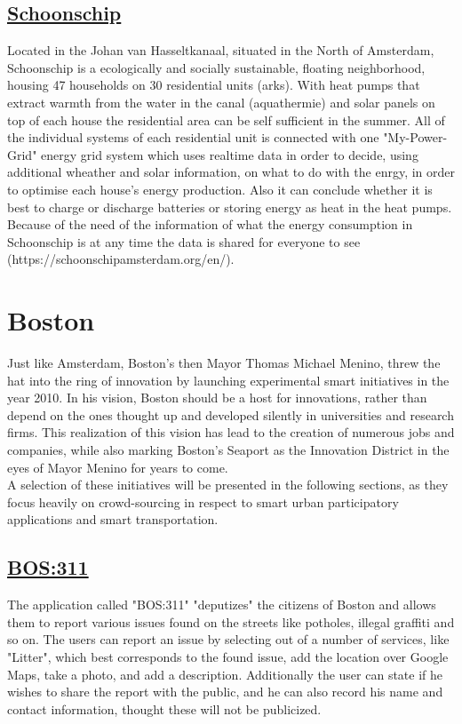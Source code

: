 \documentclass[a4paper,12pt]{report}
\begin{document}
		\subsection[Schoonschip]{\href{https://schoonschipamsterdam.org/en/}{Schoonschip}} \label{Schoonschipp}
		\startsubsection
			Located in the Johan van Hasseltkanaal, situated in the North of Amsterdam, Schoonschip is a ecologically and socially sustainable, floating neighborhood, housing 47 households on 30 residential units (arks). With heat pumps that extract warmth from the water in the canal (aquathermie) and solar panels on top of each house the residential area can be self sufficient in the summer. All of the individual systems of each residential unit is connected with one "My-Power-Grid" energy grid system which uses realtime data in order to decide, using additional wheather and solar information, on what to do with the enrgy, in order to optimise each house's energy production. Also it can conclude whether it is best to charge or discharge batteries or storing energy as heat in the heat pumps. Because of the need of the information of what the energy consumption in Schoonschip is at any time the data is shared for everyone to see (https://schoonschipamsterdam.org/en/).
		\closesection
	\closesection
	
	\section[Boston]{Boston \cite{SmartCityBoston}}
	\startsection
		Just like Amsterdam, Boston's then Mayor Thomas Michael Menino, threw the hat into the ring of innovation by launching experimental smart initiatives in the year 2010. In his vision, Boston should be a host for innovations, rather than depend on the ones thought up and developed silently in universities and research firms. This realization of this vision has lead to the creation of numerous jobs and companies, while also marking Boston's Seaport as the Innovation District in the eyes of Mayor Menino for years to come.\\
		A selection of these initiatives will be presented in the following sections, as they focus heavily on crowd-sourcing in respect to smart urban participatory applications and smart transportation.
		\subsection[BOS:311]{\href{https://311.boston.gov/}{BOS:311}}
		\startsubsection
		The application called "BOS:311" "deputizes" the citizens of Boston and allows them to report various issues found on the streets like potholes, illegal graffiti and so on. The users can report an issue by selecting out of a number of services, like "Litter", which best corresponds to the found issue, add the location over Google Maps, take a photo, and add a description. Additionally the user can state if he wishes to share the report with the public, and he can also record his name and contact information, thought these will not be publicized. 
		\closesection		
\end{document}

